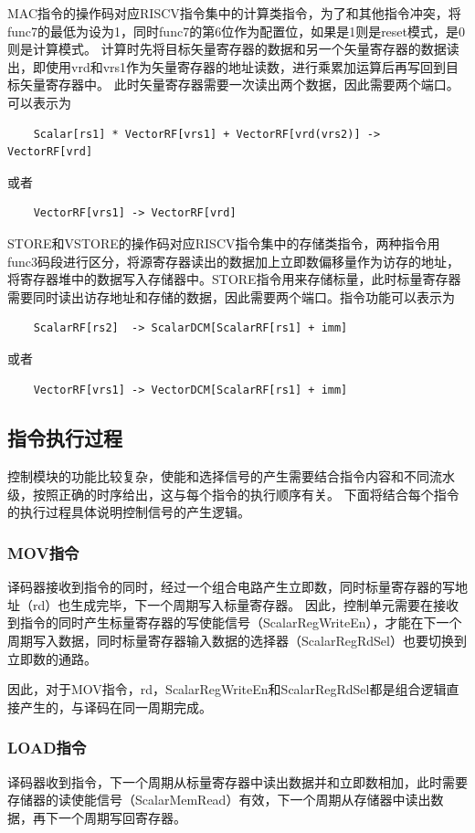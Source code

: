 \documentclass[UTF8]{ctexart}
\begin{document}
MAC指令的操作码对应RISCV指令集中的计算类指令，为了和其他指令冲突，将func7的最低为设为1，同时func7的第6位作为配置位，如果是1则是reset模式，是0则是计算模式。
计算时先将目标矢量寄存器的数据和另一个矢量寄存器的数据读出，即使用vrd和vrs1作为矢量寄存器的地址读数，进行乘累加运算后再写回到目标矢量寄存器中。
此时矢量寄存器需要一次读出两个数据，因此需要两个端口。
可以表示为
\begin{lstlisting}
    Scalar[rs1] * VectorRF[vrs1] + VectorRF[vrd(vrs2)] -> VectorRF[vrd]
\end{lstlisting} 
或者
\begin{lstlisting}
    VectorRF[vrs1] -> VectorRF[vrd]
\end{lstlisting}

STORE和VSTORE的操作码对应RISCV指令集中的存储类指令，两种指令用func3码段进行区分，将源寄存器读出的数据加上立即数偏移量作为访存的地址，
将寄存器堆中的数据写入存储器中。STORE指令用来存储标量，此时标量寄存器需要同时读出访存地址和存储的数据，因此需要两个端口。指令功能可以表示为
\begin{lstlisting}
    ScalarRF[rs2]  -> ScalarDCM[ScalarRF[rs1] + imm]
\end{lstlisting} 
或者
\begin{lstlisting}
    VectorRF[vrs1] -> VectorDCM[ScalarRF[rs1] + imm]
\end{lstlisting} 

\subsection{指令执行过程}
控制模块的功能比较复杂，使能和选择信号的产生需要结合指令内容和不同流水级，按照正确的时序给出，这与每个指令的执行顺序有关。
下面将结合每个指令的执行过程具体说明控制信号的产生逻辑。
\subsubsection{MOV指令}
译码器接收到指令的同时，经过一个组合电路产生立即数，同时标量寄存器的写地址（rd）也生成完毕，下一个周期写入标量寄存器。
因此，控制单元需要在接收到指令的同时产生标量寄存器的写使能信号（ScalarRegWriteEn），才能在下一个周期写入数据，同时标量寄存器输入数据的选择器（ScalarRegRdSel）也要切换到立即数的通路。

因此，对于MOV指令，rd，ScalarRegWriteEn和ScalarRegRdSel都是组合逻辑直接产生的，与译码在同一周期完成。

\subsubsection{LOAD指令}
译码器收到指令，下一个周期从标量寄存器中读出数据并和立即数相加，此时需要存储器的读使能信号（ScalarMemRead）有效，下一个周期从存储器中读出数据，再下一个周期写回寄存器。
\end{document}
